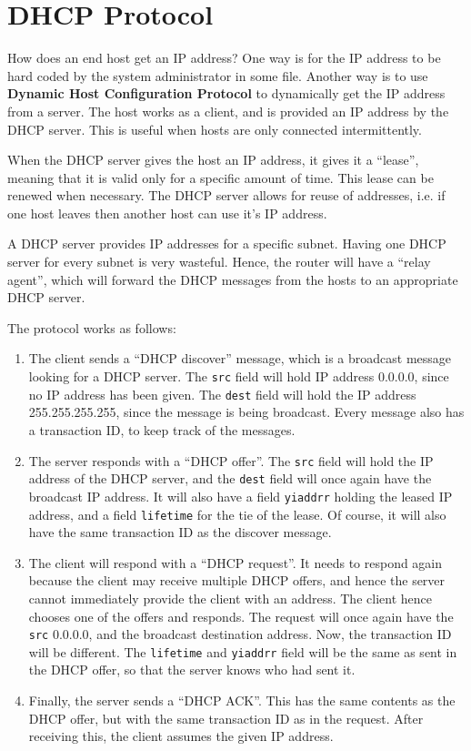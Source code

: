 \documentclass[12pt,letterpaper]{book}
\theoremstyle{definition}
\begin{document}
\section{DHCP Protocol}

How does an end host get an IP address? One way is for the IP address to be hard coded by the system administrator in some file. Another way is to use \textbf{Dynamic Host Configuration Protocol}  to dynamically get the IP address from a server. The host works as a client, and is provided an IP address by the DHCP server. This is useful when hosts are only connected intermittently.

When the DHCP server gives the host an IP address, it gives it a ``lease'', meaning that it is valid only for a specific amount of time. This lease can be renewed when necessary. The DHCP server allows for reuse of addresses, i.e. if one host leaves then another host can use it's IP address.

A DHCP server provides IP addresses for a specific subnet. Having one DHCP server for every subnet is very wasteful. Hence, the router will have a ``relay agent'', which will forward the DHCP messages from the hosts to an appropriate DHCP server.

The protocol works as follows:

\begin{enumerate}
  \item The client sends a ``DHCP discover'' message, which is a broadcast message looking for a DHCP server. The \texttt{src} field will hold IP address 0.0.0.0, since no IP address has been given. The \texttt{dest} field will hold the IP address 255.255.255.255, since the message is being broadcast. Every message also has a transaction ID, to keep track of the messages.
  \item The server responds with a ``DHCP offer''. The \texttt{src} field will hold the IP address of the DHCP server, and the \texttt{dest} field will once again have the broadcast IP address. It will also have a field \texttt{yiaddrr} holding the leased IP address, and a field \texttt{lifetime} for the tie of the lease. Of course, it will also have the same transaction ID as the discover message.
  \item The client will respond with a ``DHCP request''. It needs to respond again because the client may receive multiple DHCP offers, and hence the server cannot immediately provide the client with an address. The client hence chooses one of the offers and responds. The request will once again have the \texttt{src} 0.0.0.0, and the broadcast destination address. Now, the transaction ID will be different. The \texttt{lifetime} and \texttt{yiaddrr} field will be the same as sent in the DHCP offer, so that the server knows who had sent it.
  \item Finally, the server sends a ``DHCP ACK''. This has the same contents as the DHCP offer, but with the same transaction ID as in the request. After receiving this, the client assumes the given IP address.
\end{enumerate}
\end{document}
